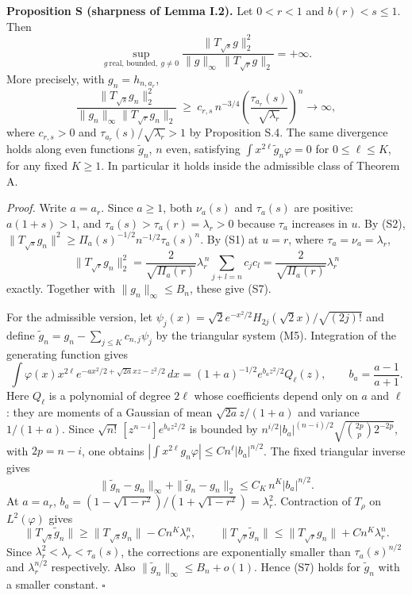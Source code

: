 \documentclass[
  british,
  10pt,
]{article}
\begin{document}
\textbf{Proposition S (sharpness of Lemma I.2).} Let \(0<r<1\) and
\(b(r)<s\le1\). Then \[
\sup_{g\ \text{real, bounded},\ g\ne0}
\frac{\|T_{\sqrt s}g\|_2^2}{\|g\|_\infty\,\|T_{\sqrt r}g\|_2}=+\infty .
\tag{S5}
\] More precisely, with \(g_n=h_{n,a_r}\), \[
\frac{\|T_{\sqrt s}g_n\|_2^2}{\|g_n\|_\infty\|T_{\sqrt r}g_n\|_2}
\ \ge\ c_{r,s}\,n^{-3/4}\left(\frac{\tau_{a_r}(s)}{\sqrt{\lambda_r}}\right)^{n}
\longrightarrow\infty,
\tag{S7}
\] where \(c_{r,s}>0\) and \(\tau_{a_r}(s)/\sqrt{\lambda_r}>1\) by
Proposition S.4. The same divergence holds along even functions
\(\widetilde g_n\), \(n\) even, satisfying
\(\int x^{2\ell}\widetilde g_n\varphi=0\) for \(0\le\ell\le K\), for any
fixed \(K\ge1\). In particular it holds inside the admissible class of
Theorem A.

\emph{Proof.} Write \(a=a_r\). Since \(a\ge1\), both \(\nu_a(s)\) and
\(\tau_a(s)\) are positive: \(a(1+s)>1\), and
\(\tau_a(s)>\tau_a(r)=\lambda_r>0\) because \(\tau_a\) increases in
\(u\). By (S2),
\(\|T_{\sqrt s}g_n\|^2\ge\Pi_a(s)^{-1/2}n^{-1/2}\tau_a(s)^n\). By (S1)
at \(u=r\), where \(\tau_a=\nu_a=\lambda_r\), \[
\|T_{\sqrt r}g_n\|_2^2=\frac{2}{\sqrt{\Pi_a(r)}}\lambda_r^{\,n}\sum_{j+l=n}c_jc_l=\frac{2}{\sqrt{\Pi_a(r)}}\lambda_r^{\,n}
\tag{S8}
\] exactly. Together with \(\|g_n\|_\infty\le B_n\), these give (S7).

For the admissible version, let
\(\psi_j(x)=\sqrt2e^{-x^2/2}H_{2j}(\sqrt2x)/\sqrt{(2j)!}\) and define
\(\widetilde g_n=g_n-\sum_{j\le K}c_{n,j}\psi_j\) by the triangular
system (M5). Integration of the generating function gives \[
\int\varphi(x)x^{2\ell}e^{-ax^2/2+\sqrt{2a}xz-z^2/2}\,dx=(1+a)^{-1/2}e^{b_az^2/2}Q_\ell(z),
\qquad b_a=\frac{a-1}{a+1}.
\] Here \(Q_\ell\) is a polynomial of degree \(2\ell\) whose
coefficients depend only on \(a\) and \(\ell\): they are moments of a
Gaussian of mean \(\sqrt{2a}z/(1+a)\) and variance \(1/(1+a)\). Since
\(\sqrt{n!}\,[z^{n-i}]e^{b_az^2/2}\) is bounded by
\(n^{i/2}|b_a|^{(n-i)/2}\sqrt{\binom{2p}{p}2^{-2p}}\), with \(2p=n-i\),
one obtains \(|\int x^{2\ell}g_n\varphi|\le C n^{\ell}|b_a|^{n/2}\). The
fixed triangular inverse gives \[
\|\widetilde g_n-g_n\|_\infty+\|\widetilde g_n-g_n\|_2\le C_K\,n^K|b_a|^{n/2}.
\] At \(a=a_r\), \(b_a=(1-\sqrt{1-r^2})/(1+\sqrt{1-r^2})=\lambda_r^2\).
Contraction of \(T_\rho\) on \(L^2(\varphi)\) gives \[
\|T_{\sqrt s}\widetilde g_n\|\ge\|T_{\sqrt s}g_n\|-Cn^K\lambda_r^n,\qquad
\|T_{\sqrt r}\widetilde g_n\|\le\|T_{\sqrt r}g_n\|+Cn^K\lambda_r^n .
\] Since \(\lambda_r^2<\lambda_r<\tau_a(s)\), the corrections are
exponentially smaller than \(\tau_a(s)^{n/2}\) and \(\lambda_r^{n/2}\)
respectively. Also \(\|\widetilde g_n\|_\infty\le B_n+o(1)\). Hence (S7)
holds for \(\widetilde g_n\) with a smaller constant. \(\square\)
\end{document}
